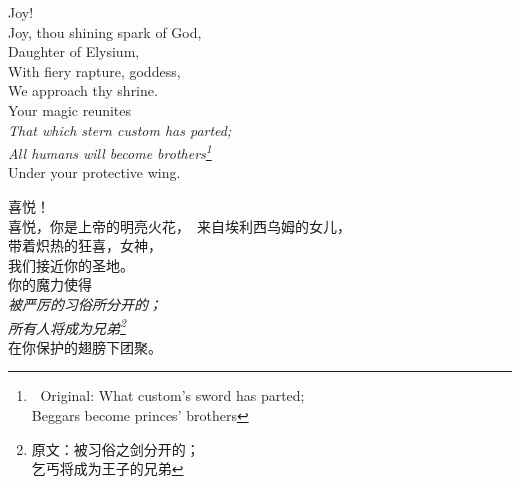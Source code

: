 \begin{paracol}{4}
\begin{Everse}
Joy! \\
Joy, thou shining spark of God,\\
Daughter of Elysium,\\
With fiery rapture, goddess,\\
We approach thy shrine.\\
Your magic reunites\\
{\itshape That which stern custom has parted;\\
All humans will become brothers\footnote{
Original: 
What custom's sword has parted;\\
Beggars become princes' brothers}}\\
Under your protective wing.
\end{Everse}
\begin{CEverse}
喜悦！ \\
喜悦，你是上帝的明亮火花，\
来自埃利西乌姆的女儿，\\
带着炽热的狂喜，女神，\\
我们接近你的圣地。\\
你的魔力使得\\
{\itshape 被严厉的习俗所分开的；\\
所有人将成为兄弟\footnote{原文：被习俗之剑分开的；\\
乞丐将成为王子的兄弟}}\\
在你保护的翅膀下团聚。
\end{CEverse}


\end{paracol}

